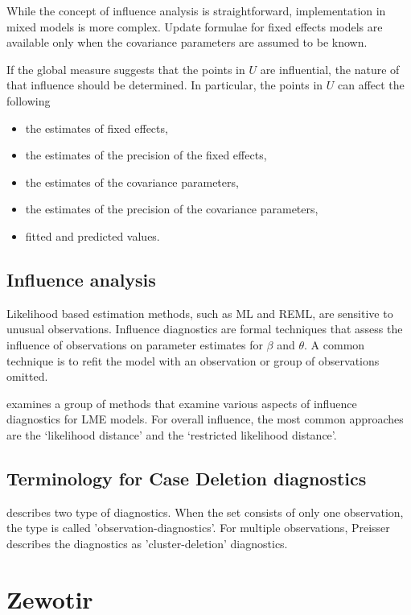 \documentclass[12pt, a4paper]{article}
\begin{document}
	While the concept of influence analysis is straightforward, implementation in mixed models is more complex. Update formulae for fixed effects models are available only when the covariance parameters are assumed to be known.
	
	If the global measure suggests that the points in $U$ are influential, the nature of that influence should be determined. In particular, the points in $U$ can affect the following
	
	\begin{itemize}
		\item the estimates of fixed effects,
		\item the estimates of the precision of the fixed effects,
		\item the estimates of the covariance parameters,
		\item the estimates of the precision of the covariance parameters,
		\item fitted and predicted values.
	\end{itemize}
	
	
	
\newpage
\section{Influence analysis} %

Likelihood based estimation methods, such as ML and REML, are sensitive to unusual observations. Influence diagnostics are formal techniques that assess the influence of observations on parameter estimates for $\beta$ and $\theta$. A common technique is to refit the model with an observation or group of observations omitted.

\citet{west} examines a group of methods that examine various aspects of influence diagnostics for LME models.
For overall influence, the most common approaches are the `likelihood distance' and the `restricted likelihood distance'.


\section{Terminology for Case Deletion diagnostics} %

\citet{preisser} describes two type of diagnostics. When the set consists of only one observation, the type is called
'observation-diagnostics'. For multiple observations, Preisser describes the diagnostics as 'cluster-deletion' diagnostics.


\chapter{Zewotir}
\end{document}
